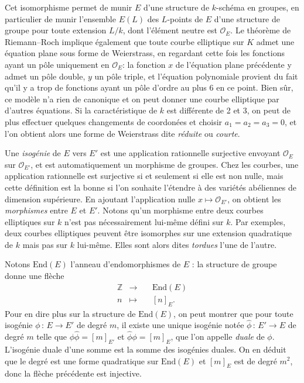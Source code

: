 \documentclass[11pt,a4paper]{article}
\newcommand{\Z}{\mathbb{Z}}
\renewcommand{\O}{\mathcal{O}}
\newcommand{\vers}{\longrightarrow}
\newcommand{\End}{\mathrm{End}}
\newcommand{\de}{\,:\,}
\renewcommand{\v}{\vspace{5mm}}
\theoremstyle{definition}
\begin{document}
Cet isomorphisme permet de munir $E$ d'une structure de $k$-schéma en groupes, en particulier de munir l'ensemble $E(L)$ des $L$-points de $E$ d'une structure de groupe pour toute extension $L/k$, dont l'élément neutre est $\O_E$. Le théorème de Riemann--Roch implique également que toute courbe elliptique sur $K$ admet une équation plane sous forme de Weierstrass, en regardant cette fois les fonctions ayant un pôle uniquement en $\O_E$: la fonction $x$ de l'équation plane précédente y admet un pôle double, $y$ un pôle triple, et l'équation polynomiale provient du fait qu'il y a trop de fonctions ayant un pôle d'ordre au plus 6 en ce point. Bien sûr, ce modèle n'a rien de canonique et on peut donner une courbe elliptique par d'autres équations. Si la caractéristique de $k$ est différente de 2 et 3, on peut de plus effectuer quelques changements de coordonées et choisir $a_1 = a_2 = a_3 = 0$, et l'on obtient alors une forme de Weierstrass dite \emph{réduite} ou \emph{courte}.

\v

Une \emph{isogénie} de $E$ vers $E'$ est une application rationnelle surjective envoyant $\O_E$ sur $\O_{E'}$, et est automatiquement un morphisme de groupes. Chez les courbes, une application rationnelle est surjective si et seulement si elle est non nulle, mais cette définition est la bonne si l'on souhaite l'étendre à des variétés abéliennes de dimension supérieure. En ajoutant l'application nulle $x\mapsto \O_{E'}$, on obtient les \emph{morphismes} entre $E$ et $E'$. Notons qu'un morphisme entre deux courbes elliptiques sur $k$ n'est pas nécessairement lui-même défini sur $k$. Par exemples, deux courbes elliptiques peuvent être isomorphes sur une extension quadratique de $k$ mais pas sur $k$ lui-même. Elles sont alors dites \emph{tordues} l'une de l'autre.

Notons $\End(E)$ l'anneau d'endomorphismes de $E$ : la structure de groupe donne une flèche
$$\begin{aligned}
&\Z &\longrightarrow&\ &\End(E) &\\
&n &\longmapsto& &[n]_E .\ \ &
\end{aligned}$$
Pour en dire plus sur la structure de $\End(E)$, on peut montrer que pour toute isogénie $\phi\de E\vers E'$ de degré $m$, il existe une unique isogénie notée $\widehat{\phi}\de E'\vers E$ de degré $m$ telle que $\phi\widehat{\phi}=[m]_{E'}$ et $\widehat{\phi}\phi=[m]_{E}$, que l'on appelle \emph{duale} de $\phi$. L'isogénie duale d'une somme est la somme des isogénies duales. On en déduit que le degré est une forme quadratique sur $\End(E)$ et $[m]_E$ est de degré $m^2$, donc la flèche précédente est injective.
\end{document}
